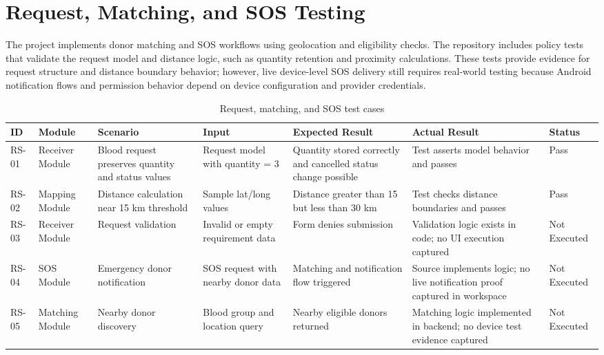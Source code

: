 
\section{Request, Matching, and SOS Testing}

The project implements donor matching and SOS workflows using geolocation and eligibility checks. The repository includes policy tests that validate the request model and distance logic, such as quantity retention and proximity calculations. These tests provide evidence for request structure and distance boundary behavior; however, live device-level SOS delivery still requires real-world testing because Android notification flows and permission behavior depend on device configuration and provider credentials.

\begin{table}[H]
\centering
\caption{Request, matching, and SOS test cases}
\begin{tabularx}{\textwidth}{|p{1.6cm}|p{2.7cm}|X|X|X|p{1.6cm}|p{2.5cm}|}
\hline
\textbf{ID} & \textbf{Module} & \textbf{Scenario} & \textbf{Input} & \textbf{Expected Result} & \textbf{Actual Result} & \textbf{Status} \\
\hline
RS-01 & Receiver Module & Blood request preserves quantity and status values & Request model with quantity = 3 & Quantity stored correctly and cancelled status change possible & Test asserts model behavior and passes & Pass \\
\hline
RS-02 & Mapping Module & Distance calculation near 15 km threshold & Sample lat/long values & Distance greater than 15 but less than 30 km & Test checks distance boundaries and passes & Pass \\
\hline
RS-03 & Receiver Module & Request validation & Invalid or empty requirement data & Form denies submission & Validation logic exists in code; no UI execution captured & Not Executed \\
\hline
RS-04 & SOS Module & Emergency donor notification & SOS request with nearby donor data & Matching and notification flow triggered & Source implements logic; no live notification proof captured in workspace & Not Executed \\
\hline
RS-05 & Matching Module & Nearby donor discovery & Blood group and location query & Nearby eligible donors returned & Matching logic implemented in backend; no device test evidence captured & Not Executed \\
\hline
\end{tabularx}
\end{table}

